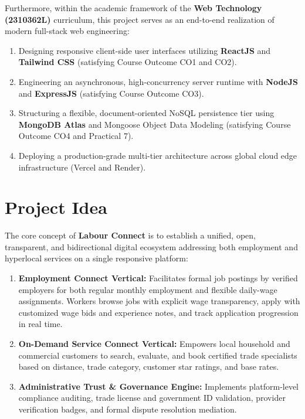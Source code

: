 Furthermore, within the academic framework of the \textbf{Web Technology (2310362L)} curriculum, this project serves as an end-to-end realization of modern full-stack web engineering:
\begin{enumerate}[label=(\alph*)]
    \item Designing responsive client-side user interfaces utilizing \textbf{ReactJS} and \textbf{Tailwind CSS} (satisfying Course Outcome CO1 and CO2).
    \item Engineering an asynchronous, high-concurrency server runtime with \textbf{NodeJS} and \textbf{ExpressJS} (satisfying Course Outcome CO3).
    \item Structuring a flexible, document-oriented NoSQL persistence tier using \textbf{MongoDB Atlas} and Mongoose Object Data Modeling (satisfying Course Outcome CO4 and Practical 7).
    \item Deploying a production-grade multi-tier architecture across global cloud edge infrastructure (Vercel and Render).
\end{enumerate}

\section{Project Idea}
The core concept of \textbf{Labour Connect} is to establish a unified, open, transparent, and bidirectional digital ecosystem addressing both employment and hyperlocal services on a single responsive platform:
\begin{enumerate}
    \item \textbf{Employment Connect Vertical:} Facilitates formal job postings by verified employers for both regular monthly employment and flexible daily-wage assignments. Workers browse jobs with explicit wage transparency, apply with customized wage bids and experience notes, and track application progression in real time.
    \item \textbf{On-Demand Service Connect Vertical:} Empowers local household and commercial customers to search, evaluate, and book certified trade specialists based on distance, trade category, customer star ratings, and base rates.
    \item \textbf{Administrative Trust \& Governance Engine:} Implements platform-level compliance auditing, trade license and government ID validation, provider verification badges, and formal dispute resolution mediation.
\end{enumerate}

